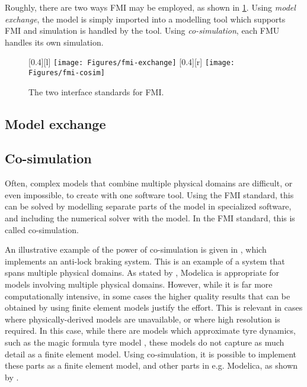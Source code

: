 \documentclass[\rootfolder/main.tex]{subfiles}
\begin{document}
Roughly, there are two ways FMI may be employed, as shown in \cref{fig:fmi}.
Using \emph{model exchange}, the model is simply imported into a modelling tool which supports FMI and simulation is handled by the tool.
Using \emph{co-simulation}, each FMU handles its own simulation.

\begin{figure}[ht]
    \centering
    [0.4\columnwidth][l]
        {
            \texttt{[image: Figures/fmi-exchange]}
        }
        [0.4\columnwidth][r]
        {
            \texttt{[image: Figures/fmi-cosim]}
        }
    \caption{The two interface standards for FMI.\label{fig:fmi}}
\end{figure}

\subsection{Model exchange}

\subsection{Co-simulation}

Often, complex models that combine multiple physical domains are difficult, or even impossible, to create with one software tool.
Using the FMI standard, this can be solved by modelling separate parts of the model in specialized software, and including the numerical solver with the model.
In the FMI standard, this is called co-simulation.

An illustrative example of the power of co-simulation is given in \cite{Schofield}, which implements an anti-lock braking system.
This is an example of a system that spans multiple physical domains.
As stated by \cite{Schofield}, Modelica is appropriate for models involving multiple physical domains.
However, while it is far more computationally intensive, in some cases the higher quality results that can be obtained by using finite element models justify the effort.
This is relevant in cases where physically-derived models are unavailable, or where high resolution is required.
In this case, while there are models which approximate tyre dynamics, such as the magic formula tyre model \cite{Pacejka2012}, these models do not capture as much detail as a finite element model.
Using co-simulation, it is possible to implement these parts as a finite element model, and other parts in e.g. Modelica, as shown by \cite{Schofield}.
\end{document}
